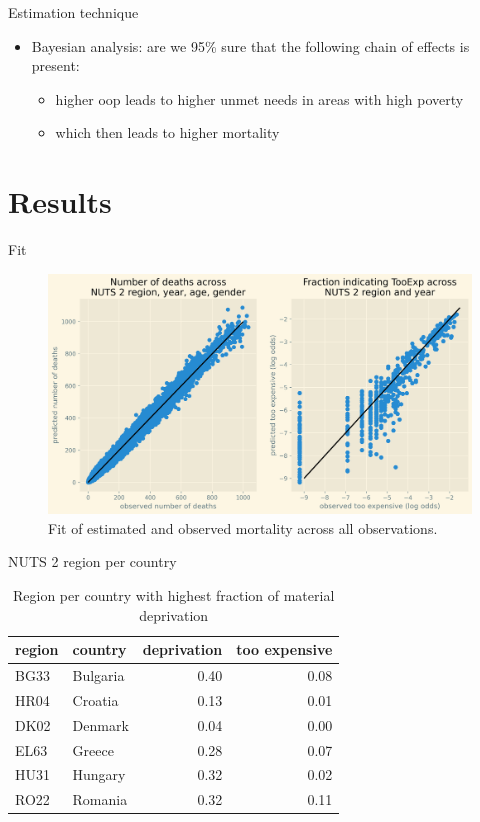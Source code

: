 \documentclass[presentation]{beamer}
\begin{document}
\begin{frame}[label={sec:org019dc2f}]{Estimation technique}
\begin{itemize}
\item Bayesian analysis: are we 95\% sure that the following chain of effects is present:
\begin{itemize}
\item higher oop leads to higher unmet needs in areas with high poverty
\item which then leads to higher mortality
\end{itemize}
\end{itemize}
\end{frame}

\section*{Results}
\label{sec:org31a59a0}

\begin{frame}[label={sec:org7f94455}]{Fit}
\begin{figure}[htbp]
\centering
\includegraphics[width=.9\linewidth]{./figures/fit_baseline_model.png}
\caption{\label{fig:ModelFit}Fit of estimated and observed mortality across all observations.}
\end{figure}
\end{frame}


\begin{frame}[label={sec:org0b50dec}]{NUTS 2 region per country}
\begin{table}[htbp]
\caption{\label{tab:region_per_country}Region per country with highest fraction of material deprivation}
\centering
\begin{tabular}{llrr}
region & country & deprivation & too expensive\\
\hline
BG33 & Bulgaria & 0.40 & 0.08\\
HR04 & Croatia & 0.13 & 0.01\\
DK02 & Denmark & 0.04 & 0.00\\
EL63 & Greece & 0.28 & 0.07\\
HU31 & Hungary & 0.32 & 0.02\\
RO22 & Romania & 0.32 & 0.11\\
\end{tabular}
\end{table}
\end{frame}
\end{document}
